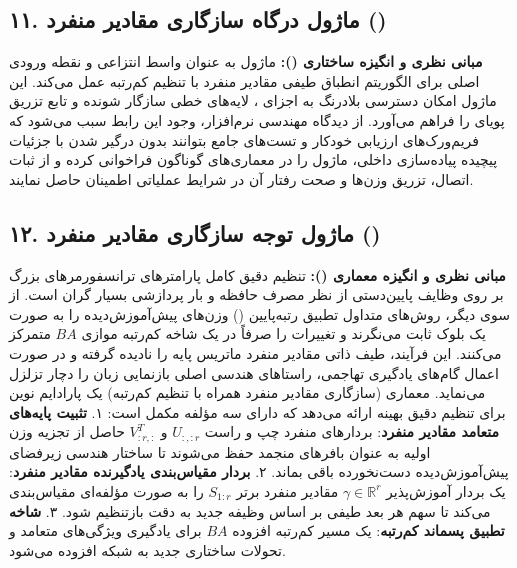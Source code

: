 \subsection*{۱۱. ماژول درگاه سازگاری مقادیر منفرد  ()}

\textbf{مبانی نظری و انگیزه ساختاری ():}
ماژول  به عنوان واسط انتزاعی و نقطه ورودی اصلی برای الگوریتم انطباق طیفی مقادیر منفرد با تنظیم کم‌رتبه عمل می‌کند. این ماژول امکان دسترسی بلادرنگ به اجزای ، لایه‌های خطی سازگار شونده  و تابع تزریق پویای  را فراهم می‌آورد.
از دیدگاه مهندسی نرم‌افزار، وجود این رابط سبب می‌شود که فریم‌ورک‌های ارزیابی خودکار و تست‌های جامع بتوانند بدون درگیر شدن با جزئیات پیچیده پیاده‌سازی داخلی، ماژول را در معماری‌های گوناگون فراخوانی کرده و از ثبات اتصال، تزریق وزن‌ها و صحت رفتار آن در شرایط عملیاتی اطمینان حاصل نمایند.



\subsection*{۱۲. ماژول توجه سازگاری مقادیر منفرد  ()}

\textbf{مبانی نظری و انگیزه معماری ():}
تنظیم دقیق کامل پارامترهای ترانسفورمرهای بزرگ بر روی وظایف پایین‌دستی از نظر مصرف حافظه و بار پردازشی بسیار گران است. از سوی دیگر، روش‌های متداول تطبیق رتبه‌پایین () وزن‌های پیش‌آموزش‌دیده را به صورت یک بلوک ثابت می‌نگرند و تغییرات را صرفاً در یک شاخه کم‌رتبه موازی $BA$ متمرکز می‌کنند. این فرآیند، طیف ذاتی مقادیر منفرد ماتریس پایه را نادیده گرفته و در صورت اعمال گام‌های یادگیری تهاجمی، راستاهای هندسی اصلی بازنمایی زبان را دچار تزلزل می‌نماید.
معماری  (سازگاری مقادیر منفرد همراه با تنظیم کم‌رتبه) یک پارادایم نوین برای تنظیم دقیق بهینه ارائه می‌دهد که دارای سه مؤلفه مکمل است:
۱. \textbf{تثبیت پایه‌های متعامد مقادیر منفرد}: بردارهای منفرد چپ و راست $U_{:, :r}$ و $V_{:r, :}^T$ حاصل از تجزیه  وزن اولیه به عنوان بافرهای منجمد حفظ می‌شوند تا ساختار هندسی زیرفضای پیش‌آموزش‌دیده دست‌نخورده باقی بماند.
۲. \textbf{بردار مقیاس‌بندی یادگیرنده مقادیر منفرد}: یک بردار آموزش‌پذیر $\gamma \in \mathbb{R}^r$ مقادیر منفرد برتر $S_{1:r}$ را به صورت مؤلفه‌ای مقیاس‌بندی می‌کند تا سهم هر بعد طیفی بر اساس وظیفه جدید به دقت بازتنظیم شود.
۳. \textbf{شاخه تطبیق پسماند کم‌رتبه}: یک مسیر کم‌رتبه افزوده $BA$ برای یادگیری ویژگی‌های متعامد و تحولات ساختاری جدید به شبکه افزوده می‌شود.

